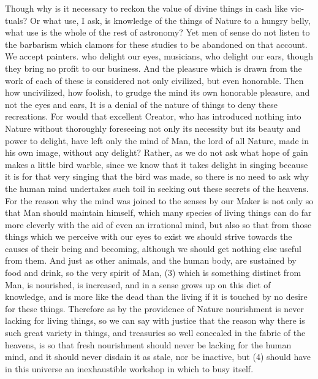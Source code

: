 \documentclass{article}
\begin{document}
{{{{{{Though why is it necessary to reckon the value of divine things in cash like vic-
tuals? Or what use, I ask, is knowledge of the things of Nature to a hungry belly,
what use is the whole of the rest of astronomy? Yet men of sense do not listen to
the barbarism which clamors for these studies to be abandoned on that account.
We accept painters. who delight our eyes, musicians, who delight our ears,
though they bring no profit to our business. And the pleasure which is drawn
from the work of each of these is considered not only civilized, but even
honorable. Then how uncivilized, how foolish, to grudge the mind its own
honorable pleasure, and not the eyes and ears, It is a denial of the nature of things
to deny these recreations. For would that excellent Creator, who has introduced
nothing into Nature without thoroughly foreseeing not only its necessity but its
beauty and power to delight, have left only the mind of Man, the lord of all
Nature, made in his own image, without any delight? Rather, as we do not ask
what hope of gain makes a little bird warble, since we know that it takes delight in
singing because it is for that very singing that the bird was made, so there is no
need to ask why the human mind undertakes such toil in seeking out these secrets
of the heavens. For the reason why the mind was joined to the senses by our
Maker is not only so that Man should maintain himself, which many species of
living things can do far more cleverly with the aid of even an irrational mind, but
also so that from those things which we perceive with our eyes to exist we should
strive towards the causes of their being and becoming, although we should get
nothing else useful from them. And just as other animals, and the human body,
are sustained by food and drink, so the very spirit of Man, (3) which is something
distinct from Man, is nourished, is increased, and in a sense grows up on this diet
of knowledge, and is more like the dead than the living if it is touched by no desire
for these things. Therefore as by the providence of Nature nourishment is never
lacking for living things, so we can say with justice that the reason why there is
such great variety in things, and treasuries so well concealed in the fabric of the
heavens, is so that fresh nourishment should never be lacking for the human
mind, and it should never disdain it as stale, nor be inactive, but (4) should have
in this universe an inexhaustible workshop in which to busy itself.

}}}}}}
\end{document}
